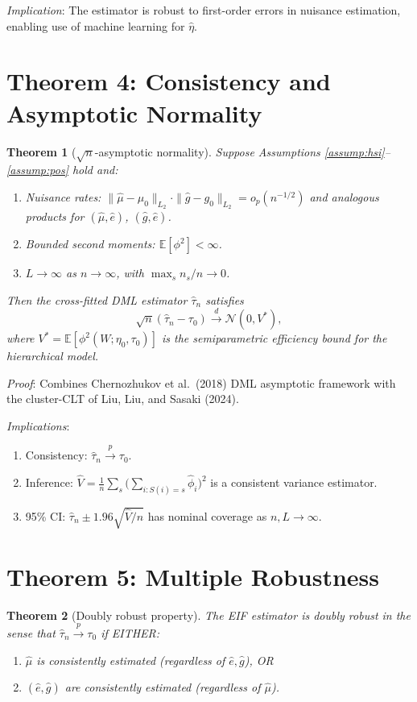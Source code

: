 \documentclass[11pt]{article}
\theoremstyle{plain}
\newtheorem{theorem}{Theorem}
\theoremstyle{definition}
\newcommand{\E}{\mathbb{E}}
\begin{document}
\textit{Implication}: The estimator is robust to first-order errors in nuisance estimation, enabling use of machine learning for $\hat\eta$.

\section{Theorem 4: Consistency and Asymptotic Normality}

\begin{theorem}[$\sqrt{n}$-asymptotic normality]
\label{thm:asymptotic}
Suppose Assumptions \ref{assump:hsi}--\ref{assump:pos} hold and:
\begin{enumerate}
    \item[(i)] Nuisance rates: $\|\hat\mu - \mu_0\|_{L_2} \cdot \|\hat g - g_0\|_{L_2} = o_p(n^{-1/2})$ and analogous products for $(\hat\mu, \hat e)$, $(\hat g, \hat e)$.
    \item[(ii)] Bounded second moments: $\E[\phi^2] < \infty$.
    \item[(iii)] $L \to \infty$ as $n \to \infty$, with $\max_s n_s / n \to 0$.
\end{enumerate}
Then the cross-fitted DML estimator $\hat\tau_n$ satisfies
\[
    \sqrt{n}(\hat\tau_n - \tau_0) \xrightarrow{d} \mathcal{N}(0, V^*),
\]
where $V^* = \E[\phi^2(W; \eta_0, \tau_0)]$ is the semiparametric efficiency bound for the hierarchical model.
\end{theorem}

\textit{Proof}: Combines Chernozhukov et al.\ (2018) DML asymptotic framework with the cluster-CLT of Liu, Liu, and Sasaki (2024).

\textit{Implications}:
\begin{enumerate}[itemsep=2pt]
    \item Consistency: $\hat\tau_n \xrightarrow{p} \tau_0$.
    \item Inference: $\hat V = \frac{1}{n}\sum_s \big(\sum_{i: S(i)=s} \hat\phi_i\big)^2$ is a consistent variance estimator.
    \item 95\% CI: $\hat\tau_n \pm 1.96 \sqrt{\hat V / n}$ has nominal coverage as $n, L \to \infty$.
\end{enumerate}

\section{Theorem 5: Multiple Robustness}

\begin{theorem}[Doubly robust property]
\label{thm:dr}
The EIF estimator is doubly robust in the sense that $\hat\tau_n \xrightarrow{p} \tau_0$ if EITHER:
\begin{enumerate}
    \item[(a)] $\hat\mu$ is consistently estimated (regardless of $\hat e, \hat g$), OR
    \item[(b)] $(\hat e, \hat g)$ are consistently estimated (regardless of $\hat\mu$).
\end{enumerate}
\end{theorem}
\end{document}
